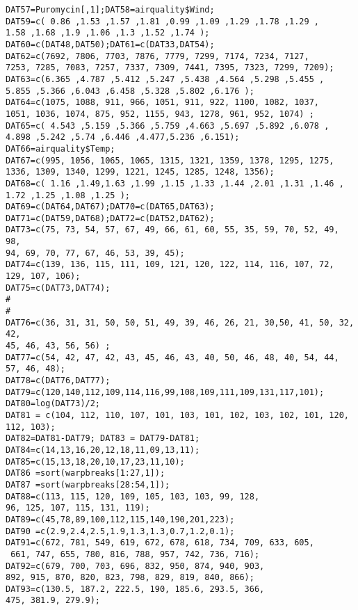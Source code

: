\documentclass[a4paper,12pt]{article}
\begin{document}
\begin{verbatim}
DAT57=Puromycin[,1];DAT58=airquality$Wind;
DAT59=c( 0.86 ,1.53 ,1.57 ,1.81 ,0.99 ,1.09 ,1.29 ,1.78 ,1.29 ,
1.58 ,1.68 ,1.9 ,1.06 ,1.3 ,1.52 ,1.74 );
DAT60=c(DAT48,DAT50);DAT61=c(DAT33,DAT54);
DAT62=c(7692, 7806, 7703, 7876, 7779, 7299, 7174, 7234, 7127, 
7253, 7285, 7083, 7257, 7337, 7309, 7441, 7395, 7323, 7299, 7209);
DAT63=c(6.365 ,4.787 ,5.412 ,5.247 ,5.438 ,4.564 ,5.298 ,5.455 ,
5.855 ,5.366 ,6.043 ,6.458 ,5.328 ,5.802 ,6.176 );
DAT64=c(1075, 1088, 911, 966, 1051, 911, 922, 1100, 1082, 1037, 
1051, 1036, 1074, 875, 952, 1155, 943, 1278, 961, 952, 1074) ;
DAT65=c( 4.543 ,5.159 ,5.366 ,5.759 ,4.663 ,5.697 ,5.892 ,6.078 ,
4.898 ,5.242 ,5.74 ,6.446 ,4.477,5.236 ,6.151);
DAT66=airquality$Temp;
DAT67=c(995, 1056, 1065, 1065, 1315, 1321, 1359, 1378, 1295, 1275, 
1336, 1309, 1340, 1299, 1221, 1245, 1285, 1248, 1356);
DAT68=c( 1.16 ,1.49,1.63 ,1.99 ,1.15 ,1.33 ,1.44 ,2.01 ,1.31 ,1.46 ,
1.72 ,1.25 ,1.08 ,1.25 );
DAT69=c(DAT64,DAT67);DAT70=c(DAT65,DAT63);
DAT71=c(DAT59,DAT68);DAT72=c(DAT52,DAT62);
DAT73=c(75, 73, 54, 57, 67, 49, 66, 61, 60, 55, 35, 59, 70, 52, 49, 98, 
94, 69, 70, 77, 67, 46, 53, 39, 45); 
DAT74=c(139, 136, 115, 111, 109, 121, 120, 122, 114, 116, 107, 72, 129, 107, 106);
DAT75=c(DAT73,DAT74);
#
#
DAT76=c(36, 31, 31, 50, 50, 51, 49, 39, 46, 26, 21, 30,50, 41, 50, 32, 42, 
45, 46, 43, 56, 56) ;
DAT77=c(54, 42, 47, 42, 43, 45, 46, 43, 40, 50, 46, 48, 40, 54, 44, 57, 46, 48);
DAT78=c(DAT76,DAT77);
DAT79=c(120,140,112,109,114,116,99,108,109,111,109,131,117,101);
DAT80=log(DAT73)/2;
DAT81 = c(104, 112, 110, 107, 101, 103, 101, 102, 103, 102, 101, 120, 112, 103);
DAT82=DAT81-DAT79; DAT83 = DAT79-DAT81;
DAT84=c(14,13,16,20,12,18,11,09,13,11);
DAT85=c(15,13,18,20,10,17,23,11,10);
DAT86 =sort(warpbreaks[1:27,1]);
DAT87 =sort(warpbreaks[28:54,1]);
DAT88=c(113, 115, 120, 109, 105, 103, 103, 99, 128, 
96, 125, 107, 115, 131, 119);
DAT89=c(45,78,89,100,112,115,140,190,201,223);
DAT90 =c(2.9,2.4,2.5,1.9,1.3,1.3,0.7,1.2,0.1);
DAT91=c(672, 781, 549, 619, 672, 678, 618, 734, 709, 633, 605,
 661, 747, 655, 780, 816, 788, 957, 742, 736, 716); 
DAT92=c(679, 700, 703, 696, 832, 950, 874, 940, 903, 
892, 915, 870, 820, 823, 798, 829, 819, 840, 866);
DAT93=c(130.5, 187.2, 222.5, 190, 185.6, 293.5, 366, 
475, 381.9, 279.9);

\end{verbatim}
\end{document}
